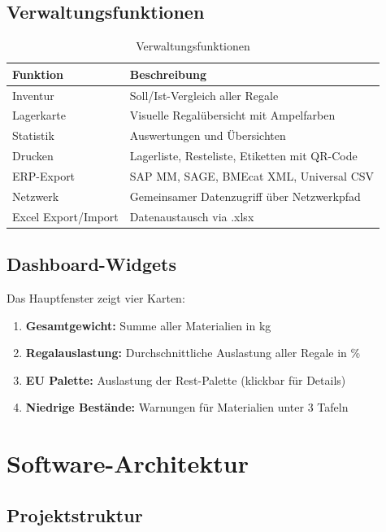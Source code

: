 \documentclass[a4paper,12pt]{article}
\begin{document}
\subsection{Verwaltungsfunktionen}

\begin{table}[h]
\centering
\begin{tabularx}{\textwidth}{l X}
\toprule
\textbf{Funktion} & \textbf{Beschreibung} \\
\midrule
Inventur & Soll/Ist-Vergleich aller Regale \\
Lagerkarte & Visuelle Regalübersicht mit Ampelfarben \\
Statistik & Auswertungen und Übersichten \\
Drucken & Lagerliste, Resteliste, Etiketten mit QR-Code \\
ERP-Export & SAP MM, SAGE, BMEcat XML, Universal CSV \\
Netzwerk & Gemeinsamer Datenzugriff über Netzwerkpfad \\
Excel Export/Import & Datenaustausch via .xlsx \\
\bottomrule
\end{tabularx}
\caption{Verwaltungsfunktionen}
\end{table}

\subsection{Dashboard-Widgets}

Das Hauptfenster zeigt vier Karten:

\begin{enumerate}
    \item \textbf{Gesamtgewicht:} Summe aller Materialien in kg
    \item \textbf{Regalauslastung:} Durchschnittliche Auslastung aller Regale in \%
    \item \textbf{EU Palette:} Auslastung der Rest-Palette (klickbar für Details)
    \item \textbf{Niedrige Bestände:} Warnungen für Materialien unter 3 Tafeln
\end{enumerate}

\section{Software-Architektur}

\subsection{Projektstruktur}
\end{document}
